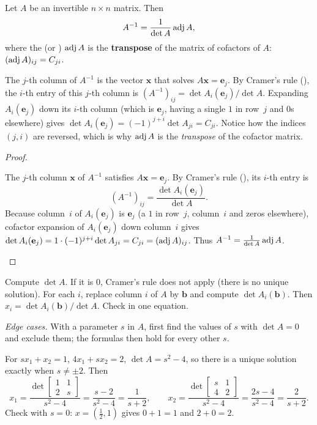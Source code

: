 \documentclass[10pt]{scrartcl}
\newcommand{\vv}[1]{\mathbf{#1}}
\begin{document}
\begin{theorem*}
  Let $A$ be an invertible $n\times n$ matrix. Then
  \[
    A^{-1} = \frac{1}{\det A}\operatorname{adj} A,
  \]
  where the  (or ) $\operatorname{adj} A$ is the \textbf{transpose} of the matrix of cofactors of $A$: $(\operatorname{adj} A)_{ij}=C_{ji}$.
\end{theorem*}
\begin{ideabox}
  The $j$-th column of $A^{-1}$ is the vector $\vv x$ that solves $A\vv x=\vv e_j$. By Cramer's rule (), the $i$-th entry of this $j$-th column is $(A^{-1})_{ij}=\det A_i(\vv e_j)/\det A$. Expanding $A_i(\vv e_j)$ down its $i$-th column (which is $\vv e_j$, having a single $1$ in row~$j$ and $0$s elsewhere) gives $\det A_i(\vv e_j)=(-1)^{j+i}\det A_{ji}=C_{ji}$. Notice how the indices $(j,i)$ are reversed, which is why $\operatorname{adj} A$ is the \emph{transpose} of the cofactor matrix.
\end{ideabox}
\begin{proof}
  \begin{steps}
    \ii The $j$-th column $\vv x$ of $A^{-1}$ satisfies $A\vv x=\vv e_j$. By Cramer's rule (), its $i$-th entry is
    \[
      (A^{-1})_{ij}=\frac{\det A_i(\vv e_j)}{\det A}.
    \]
    \ii Because column~$i$ of $A_i(\vv e_j)$ is $\vv e_j$ (a $1$ in row~$j$, column~$i$ and zeros elsewhere), cofactor expansion of $A_i(\vv e_j)$ down column~$i$ gives $\det A_i(\vv e_j)=1\cdot(-1)^{j+i}\det A_{ji}=C_{ji}=(\adj A)_{ij}$. Thus $A^{-1}=\frac{1}{\det A}\operatorname{adj} A$.
  \end{steps}
\end{proof}

\begin{steps}
  \ii Compute $\det A$. If it is $0$, Cramer's rule does not apply (there is no unique solution).
  \ii For each $i$, replace column $i$ of $A$ by $\vv b$ and compute $\det A_i(\vv b)$.
  \ii Then $x_i=\det A_i(\vv b)/\det A$. Check in one equation.
\end{steps}
\emph{Edge cases.} With a parameter $s$ in $A$, first find the values of $s$ with $\det A=0$ and exclude them; the formulas then hold for every other $s$.

\begin{example*}
For $sx_1+x_2=1$, $4x_1+sx_2=2$, $\det A=s^2-4$, so there is a unique solution exactly when $s\ne\pm2$. Then
\[
  x_1=\frac{\det\begin{bmatrix}1&1\\2&s\end{bmatrix}}{s^2-4}=\frac{s-2}{s^2-4}=\frac{1}{s+2},\qquad
  x_2=\frac{\det\begin{bmatrix}s&1\\4&2\end{bmatrix}}{s^2-4}=\frac{2s-4}{s^2-4}=\frac{2}{s+2}.
\]
Check with $s=0$: $x=(\tfrac12,1)$ gives $0+1=1$ and $2+0=2$.
\end{example*}
\end{document}
